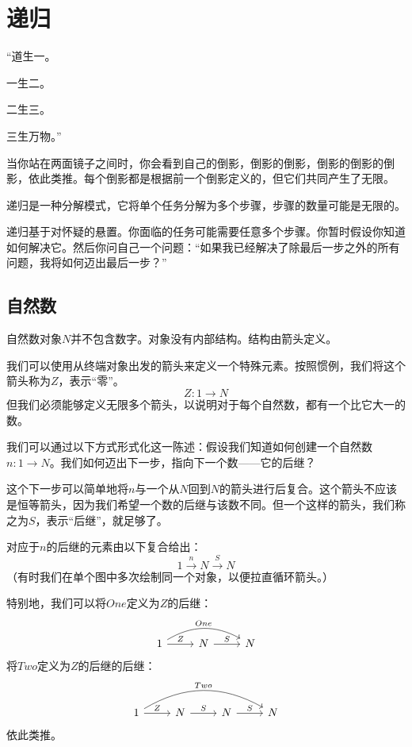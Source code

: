 \documentclass[DaoFP]{subfiles}
\begin{document}
\setcounter{chapter}{6}

\chapter{递归}

``道生一。

一生二。

二生三。

三生万物。''


\vspace{10pt}

当你站在两面镜子之间时，你会看到自己的倒影，倒影的倒影，倒影的倒影的倒影，依此类推。每个倒影都是根据前一个倒影定义的，但它们共同产生了无限。

递归是一种分解模式，它将单个任务分解为多个步骤，步骤的数量可能是无限的。

递归基于对怀疑的悬置。你面临的任务可能需要任意多个步骤。你暂时假设你知道如何解决它。然后你问自己一个问题：“如果我已经解决了除最后一步之外的所有问题，我将如何迈出最后一步？”

\section{自然数}

自然数对象$N$并不包含数字。对象没有内部结构。结构由箭头定义。

我们可以使用从终端对象出发的箭头来定义一个特殊元素。按照惯例，我们将这个箭头称为$Z$，表示“零”。
\[ Z \colon 1 \to N \]
但我们必须能够定义无限多个箭头，以说明对于每个自然数，都有一个比它大一的数。

我们可以通过以下方式形式化这一陈述：假设我们知道如何创建一个自然数$n \colon 1 \to N$。我们如何迈出下一步，指向下一个数——它的后继？

这个下一步可以简单地将$n$与一个从$N$回到$N$的箭头进行后复合。这个箭头不应该是恒等箭头，因为我们希望一个数的后继与该数不同。但一个这样的箭头，我们称之为$S$，表示“后继”，就足够了。

对应于$n$的后继的元素由以下复合给出：
\[ 1 \xrightarrow{n} N \xrightarrow{S} N\]
（有时我们在单个图中多次绘制同一个对象，以便拉直循环箭头。）

特别地，我们可以将$One$定义为$Z$的后继：
\[
 \begin{tikzcd}
 1
 \arrow[rr, bend left, "One"]
 \arrow[r, "Z"]
 &N
  \arrow[r, "S"]
&N
  \end{tikzcd}
\]
将$Two$定义为$Z$的后继的后继：
\[
 \begin{tikzcd}
 1
 \arrow[rrr, bend left, "Two"]
 \arrow[r, "Z"]
 &N
  \arrow[r, "S"]
&N
  \arrow[r, "S"]
 &N
 \end{tikzcd}
\]
依此类推。
\end{document}
